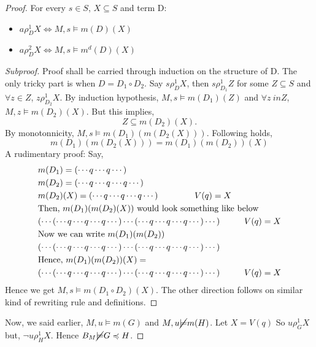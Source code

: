 \documentclass[10pt]{article}
\newcommand{\cle}{\preccurlyeq}
\begin{document}
\begin{proof}
			For every $s\in S$, $X\subseteq S$ and term D:
			\begin{itemize}
				\item $a\rho_D^1 X \Longleftrightarrow M,s \models m(D)(X)$
				\item $a\rho_D^2 X \Longleftrightarrow M,s \models m^d(D)(X)$
			\end{itemize}
			\begin{proof}[Subproof]\renewcommand{\qedsymbol}{$\dashv$}
				Proof shall be carried through induction on the structure of D. The only tricky part is when $D=D_1\circ D_2$. Say $s\rho_D^1X$, then $s\rho_{D_1}^1Z$ for some $Z\subseteq S$ and  $\forall z \in Z$, $z\rho_{D_2}^1X$. By induction hypothesis, $M,s \models m(D_1)(Z)$ and $\forall z\ in Z$, $M, z \models m(D_2)(X)$. But this implies,
				\[
				Z \subseteq m(D_2)(X).
				\]
				By monotonnicity, $M,s \models m(D_1)(m(D_2(X)))$. Following holds, 
				\[
				m(D_1)(m(D_2(X))) = m(D_1)(m(D_2))(X)
				\]
				A rudimentary proof:
				Say,
				\[
				\begin{split}
					&m(D_1) = (\cdots q \cdots q \cdots) \\
					&m(D_2) = (\cdots q \cdots q \cdots q \cdots) \\
					&m(D_2)(X) = (\cdots q \cdots q \cdots q \cdots) \hspace{1.5cm} V(q) = X\\
					&\text{Then, } m(D_1)(m(D_2)(X)) \text{ would look something like below} \\
					&(\cdots (\cdots q \cdots q \cdots q \cdots) \cdots (\cdots q \cdots q \cdots q \cdots) \cdots) \hspace{1cm } V(q) = X \\
					&\text{Now we can write } m(D_1)(m(D_2)) \\
					& (\cdots (\cdots q \cdots q \cdots q \cdots) \cdots (\cdots q \cdots q \cdots q \cdots) \cdots) \\
					&\text{Hence, }m(D_1)(m(D_2))(X) = \\
					& (\cdots (\cdots q \cdots q \cdots q \cdots) \cdots (\cdots q \cdots q \cdots q \cdots) \cdots) \hspace{1cm } V(q) = X \\
				\end{split}
				\]
				Hence we get $M,s \models m(D_1 \circ D_2)(X)$. The other direction follows on similar kind of rewriting rule and definitions. 
			\end{proof}
			Now, we said earlier, $M,u \models m(G)$ and $M,u \cancel{\models} m(H)$. Let $X=V(q)$ So $u\rho_{G}^1X$ but, $\neg u\rho_{H}^1X$. Hence $B_M \cancel{\models} G \cle H$.
		\end{proof}
		
\end{document}
